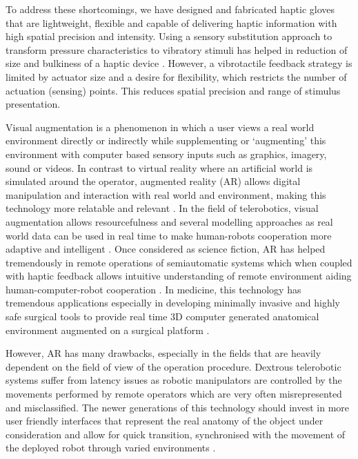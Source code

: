 \documentclass[]{article}
\begin{document}
  To address these shortcomings, we have designed and fabricated haptic gloves that are lightweight, ﬂexible and capable of delivering haptic information with high spatial precision and intensity. Using a sensory substitution approach to transform pressure characteristics to vibratory stimuli has helped in reduction of size and bulkiness of a haptic device \cite{makino2016haptoclone}. However, a vibrotactile feedback strategy is limited by actuator size and a desire for ﬂexibility, which restricts the number of actuation (sensing) points. This reduces spatial precision and range of stimulus presentation. 


  Visual augmentation is a phenomenon in which a user views a real world environment directly or indirectly while supplementing or ‘augmenting’ this environment with computer based sensory inputs such as graphics, imagery, sound or videos. In contrast to virtual reality where an artificial world is simulated around the operator, augmented reality (AR) allows digital manipulation and interaction with real world and environment, making this technology more relatable and relevant \cite{fernandes2015remembering}. In the field of telerobotics, visual augmentation allows resourcefulness and several modelling approaches as real world data can be used in real time to make human-robots cooperation more adaptive and intelligent \cite{fu2015towards}. Once considered as science fiction, AR has helped tremendously in remote operations of semiautomatic systems which when coupled with haptic feedback allows intuitive understanding of remote environment aiding human-computer-robot cooperation \cite{sheridan1995teleoperation}. In medicine, this technology has tremendous applications especially in developing minimally invasive and highly safe surgical tools to provide real time 3D computer generated anatomical environment augmented on a surgical platform \cite{haouchine2013image}. 


  However, AR has many drawbacks, especially in the fields that are heavily dependent on the field of view of the operation procedure. Dextrous telerobotic systems suffer from latency issues as robotic manipulators are controlled by the movements performed by remote operators which are very often misrepresented and misclassified. The newer generations of this technology should invest in more user friendly interfaces that represent the real anatomy of the object under consideration and allow for quick transition, synchronised with the movement of the deployed robot through varied environments \cite{berman2015design}. 
\end{document}
